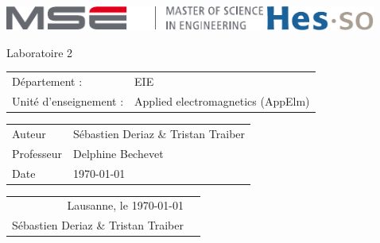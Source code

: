 \documentclass[]{report}
\newcommand{\Author}{Sébastien Deriaz \& Tristan Traiber}
\newcommand{\professor}{Delphine Bechevet}
\newcommand{\assistant}{}
\newcommand{\cours}{Applied electromagnetics (AppElm)}
\newcommand{\titre}{Laboratoire 2}
\begin{document}
\thispagestyle{empty}

\begin{center}
\includegraphics[height=8mm]{mse-full-cropped.pdf}
\hfill
\includegraphics[height=8mm]{HES-SO_logo_Pantone.pdf}
\end{center}
\vfill
\begin{center}
\Huge \titre\\
\end{center}
\begin{center}
\large
\begin{tabular}{ll}
Département : & EIE\\
Unité d'enseignement : & \cours
\end{tabular}
\end{center}
\vfill
\begin{center}
\large
\begin{tabular}{ll}
\Large Auteur & \Large \Author\\
Professeur & \professor\\ 
Date & \today
\end{tabular}
\end{center}
\vfill

\pagebreak
\tableofcontents
\pagebreak

\pagebreak

\pagebreak

\pagebreak


\begin{flushright}
\begin{tabular}{r m{3cm}}
Lausanne, le \today & \\
\Author & \\
\end{tabular}
\end{flushright}

\pagebreak
\end{document}
